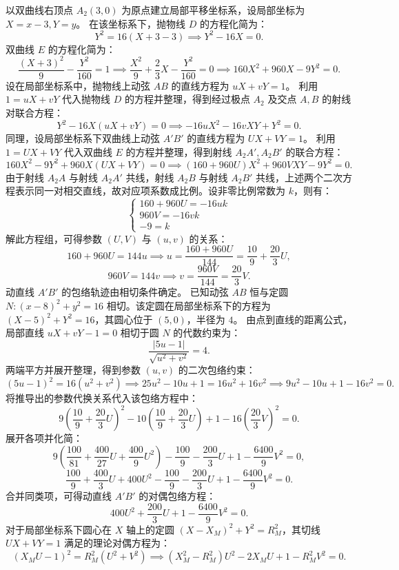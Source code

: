 \begin{solution}
以双曲线右顶点 $A_2(3,0)$ 为原点建立局部平移坐标系，设局部坐标为 $X = x - 3, Y = y$。
在该坐标系下，抛物线 $D$ 的方程化简为：
\[ Y^2 = 16(X + 3 - 3) \implies Y^2 - 16X = 0. \]
双曲线 $E$ 的方程化简为：
\[ \frac{(X+3)^2}{9} - \frac{Y^2}{160} = 1 \implies \frac{X^2}{9} + \frac{2}{3}X - \frac{Y^2}{160} = 0 \implies 160X^2 + 960X - 9Y^2 = 0. \]
设在局部坐标系中，抛物线上动弦 $AB$ 的直线方程为 $uX + vY = 1$。
利用 $1 = uX + vY$ 代入抛物线 $D$ 的方程并整理，得到经过极点 $A_2$ 及交点 $A, B$ 的射线对联合方程：
\[ Y^2 - 16X(uX + vY) = 0 \implies -16u X^2 - 16v XY + Y^2 = 0. \]
同理，设局部坐标系下双曲线上动弦 $A'B'$ 的直线方程为 $UX + VY = 1$。
利用 $1 = UX + VY$ 代入双曲线 $E$ 的方程并整理，得到射线 $A_2A', A_2B'$ 的联合方程：
\[ 160X^2 - 9Y^2 + 960X(UX + VY) = 0 \implies (160 + 960U)X^2 + 960V XY - 9Y^2 = 0. \]
由于射线 $A_2A$ 与射线 $A_2A'$ 共线，射线 $A_2B$ 与射线 $A_2B'$ 共线，上述两个二次方程表示同一对相交直线，故对应项系数成比例。设非零比例常数为 $k$，则有：
\[ \begin{cases} 160 + 960U = -16uk \\ 960V = -16vk \\ -9 = k \end{cases} \]
解此方程组，可得参数 $(U, V)$ 与 $(u, v)$ 的关系：
\[ 160 + 960U = 144u \implies u = \frac{160 + 960U}{144} = \frac{10}{9} + \frac{20}{3}U, \]
\[ 960V = 144v \implies v = \frac{960V}{144} = \frac{20}{3}V. \]
动直线 $A'B'$ 的包络轨迹由相切条件确定。
已知动弦 $AB$ 恒与定圆 $N: (x - 8)^2 + y^2 = 16$ 相切。该定圆在局部坐标系下的方程为 $(X - 5)^2 + Y^2 = 16$，其圆心位于 $(5,0)$，半径为 $4$。
由点到直线的距离公式，局部直线 $uX + vY - 1 = 0$ 相切于圆 $N$ 的代数约束为：
\[ \frac{|5u - 1|}{\sqrt{u^2 + v^2}} = 4. \]
两端平方并展开整理，得到参数 $(u, v)$ 的二次包络约束：
\[ (5u - 1)^2 = 16(u^2 + v^2) \implies 25u^2 - 10u + 1 = 16u^2 + 16v^2 \implies 9u^2 - 10u + 1 - 16v^2 = 0. \]
将推导出的参数代换关系代入该包络方程中：
\[ 9\left(\frac{10}{9} + \frac{20}{3}U\right)^2 - 10\left(\frac{10}{9} + \frac{20}{3}U\right) + 1 - 16\left(\frac{20}{3}V\right)^2 = 0. \]
展开各项并化简：
\[ 9\left(\frac{100}{81} + \frac{400}{27}U + \frac{400}{9}U^2\right) - \frac{100}{9} - \frac{200}{3}U + 1 - \frac{6400}{9}V^2 = 0, \]
\[ \frac{100}{9} + \frac{400}{3}U + 400U^2 - \frac{100}{9} - \frac{200}{3}U + 1 - \frac{6400}{9}V^2 = 0. \]
合并同类项，可得动直线 $A'B'$ 的对偶包络方程：
\[ 400U^2 + \frac{200}{3}U + 1 - \frac{6400}{9}V^2 = 0. \]
对于局部坐标系下圆心在 $X$ 轴上的定圆 $(X - X_M)^2 + Y^2 = R_M^2$，其切线 $UX + VY = 1$ 满足的理论对偶方程为：
\[ (X_M U - 1)^2 = R_M^2(U^2 + V^2) \implies (X_M^2 - R_M^2)U^2 - 2X_M U + 1 - R_M^2 V^2 = 0. \]

\end{solution}
